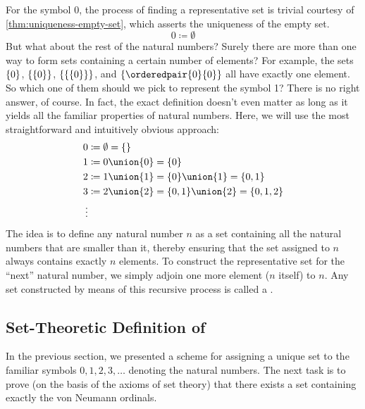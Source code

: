 \vspace{0.3cm}
\noindent
For the symbol 0, the process of finding a representative set is trivial courtesy of 
\cref{thm:uniqueness-empty-set}, which asserts the uniqueness of the empty set.
\begin{equation*}
    0 \coloneq \emptyset
\end{equation*}
But what about the rest of the natural numbers? Surely there are more than one way to form sets containing a certain number of elements?
For example, the sets \( \mleft\{ 0 \mright\} \), \( \mleft\{ \mleft\{ 0 \mright\} \mright\} \), \( \mleft\{ \mleft\{ \mleft\{ 0 \mright\} \mright\} \mright\} \),
and \( \mleft\{ \orderedpair{0}{0} \mright\} \) all have exactly one element.
So which one of them should we pick to represent the symbol 1? There is no right answer, of course.
In fact, the exact definition doesn't even matter as long as it yields all the familiar properties of natural numbers.
Here, we will use the most straightforward and intuitively obvious approach:
\begin{align*}
    0 &\coloneq \emptyset = \mleft\{ \mright\} \\
    1 &\coloneq 0 \union \mleft\{ 0 \mright\} = \{0\} \\
    2 &\coloneq 1 \union \mleft\{ 1 \mright\} = \{0\} \union \{1\} = \{0,1\}\\
    3 &\coloneq 2 \union \mleft\{ 2 \mright\} = \{0,1\} \union \{2\} = \{0,1,2\}\\
    \vdots
\end{align*}
The idea is to define any natural number \( n \) as a set containing all the natural numbers that are smaller
than it, thereby ensuring that the set assigned to \( n \) always contains exactly \( n \) elements.
To construct the representative set for the ``next'' natural number,
we simply adjoin one more element (\( n \) itself) to \( n \).
Any set constructed by means of this recursive process is called a .

\subsection{Set-Theoretic Definition of \naturalset}
In the previous section, we presented a scheme for assigning a unique set to the familiar symbols \( 0,1,2,3,\dots \) denoting
the natural numbers. The next task is to prove (on the basis of the axioms of set theory) that there exists a set containing
exactly the von Neumann ordinals.

